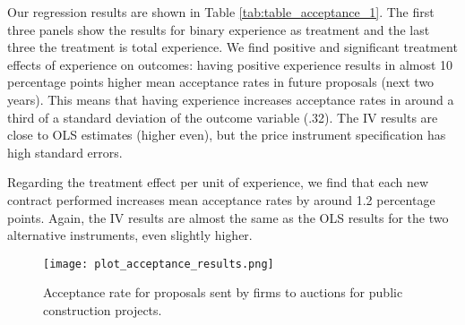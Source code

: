 Our regression results are shown in Table \ref{tab:table_acceptance_1}. The first three panels show the results for binary experience as treatment and the last three the treatment is total experience. We find positive and significant treatment effects of experience on outcomes: having positive experience results in almost 10 percentage points higher mean acceptance rates in future proposals (next two years). This means that having experience increases acceptance rates in around a third of a standard deviation of the outcome variable (.32). The IV results are close to OLS estimates (higher even), but the price instrument specification has high standard errors.

Regarding the treatment effect per unit of experience, we find that each new contract performed increases mean acceptance rates by around 1.2 percentage points. Again, the IV results are almost the same as the OLS results for the two alternative instruments, even slightly higher.
 \clearpage
\begin{figure}
\centering
  \texttt{[image: plot\_acceptance\_results.png]}
  \caption{Acceptance rate for proposals sent by firms to auctions for public construction projects.}
  \label{fig:plot_acceptance_results}
\end{figure}



